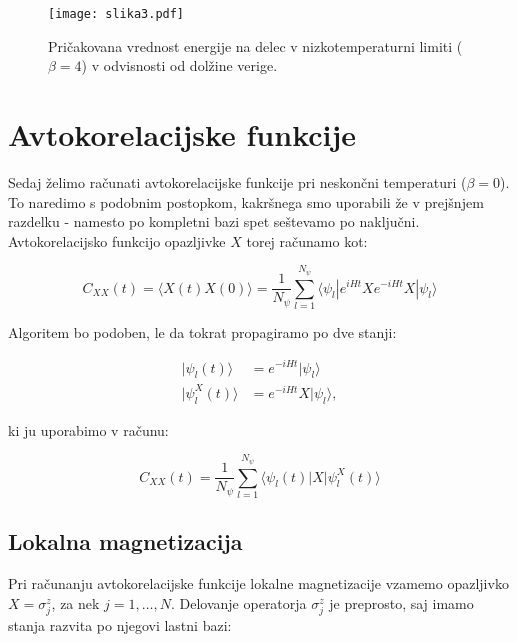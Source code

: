 \documentclass[a4paper]{article}
\newcommand{\bra}[1]{\langle#1|}
\newcommand{\ket}[1]{|#1\rangle}
\begin{document}
    \begin{figure}
        \centering
        \texttt{[image: slika3.pdf]}
        \caption{Pričakovana vrednost energije na delec v nizkotemperaturni limiti ($\beta = 4$) v odvisnosti od
        dolžine verige.}
        \label{slika3}
    \end{figure}

    \section{Avtokorelacijske funkcije}

    Sedaj želimo računati avtokorelacijske funkcije pri neskončni temperaturi ($\beta = 0$).
    To naredimo s podobnim postopkom, kakršnega smo uporabili že v prejšnjem razdelku - namesto po
    kompletni bazi spet seštevamo po naključni. Avtokorelacijsko funkcijo opazljivke $X$ torej računamo kot:

    \begin{equation}\label{eq15}
        C_{XX}(t) = \langle X(t)X(0) \rangle =
        \frac{1}{N_\psi} \sum_{l=1}^{N_\psi} \bra{\psi_l} e^{iHt}Xe^{-iHt}X \ket{\psi_l}
    \end{equation}

    Algoritem bo podoben, le da tokrat propagiramo po dve stanji:

    \begin{equation}\label{eq16}
        \begin{split}
            \ket{\psi_l(t)} &= e^{-iHt}\ket{\psi_l}\\
            \ket{\psi_l^X(t)} &= e^{-iHt}X\ket{\psi_l},
        \end{split}
    \end{equation}

    ki ju uporabimo v računu:

    \begin{equation}\label{eq17}
        C_{XX}(t) = \frac{1}{N_\psi} \sum_{l=1}^{N_\psi} \bra{\psi_l(t)} X \ket{\psi_l^X(t)}
    \end{equation}

    \subsection{Lokalna magnetizacija}

    Pri računanju avtokorelacijske funkcije lokalne magnetizacije vzamemo opazljivko $X = \sigma_j^z$, za nek
    $j = 1, \ldots, N$. Delovanje operatorja $\sigma_j^z$ je preprosto, saj imamo stanja razvita po njegovi lastni bazi:
\end{document}
